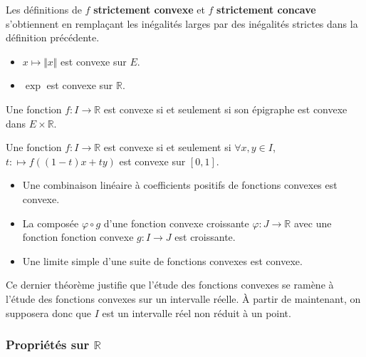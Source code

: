 	\begin{remark}
		Les définitions de $f$ \textbf{strictement convexe} et $f$ \textbf{strictement concave} s'obtiennent en remplaçant les inégalités larges par des inégalités strictes dans la définition précédente.
	\end{remark}

	\begin{example}
		\begin{itemize}
			\item $x \mapsto \Vert x \Vert$ est convexe sur $E$.
			\item $\exp$ est convexe sur $\mathbb{R}$.
		\end{itemize}
	\end{example}

	\begin{proposition}
		Une fonction $f : I \rightarrow \mathbb{R}$ est convexe si et seulement si son épigraphe est convexe dans $E \times \mathbb{R}$.
	\end{proposition}

	\begin{theorem}
		Une fonction $f : I \rightarrow \mathbb{R}$ est convexe si et seulement si $\forall x, y \in I$, $t : \mapsto f((1-t)x + ty)$ est convexe sur $[0,1]$.
	\end{theorem}

	\begin{proposition}
		\begin{itemize}
			\item Une combinaison linéaire à coefficients positifs de fonctions convexes est convexe.
			\item La composée $\varphi \circ g$ d'une fonction convexe croissante $\varphi : J \rightarrow \mathbb{R}$ avec une fonction fonction convexe $g : I \rightarrow J$ est croissante.
			\item Une limite simple d'une suite de fonctions convexes est convexe.
		\end{itemize}
	\end{proposition}

	Ce dernier théorème justifie que l'étude des fonctions convexes se ramène à l'étude des fonctions convexes sur un intervalle réelle. À partir de maintenant, on supposera donc que $I$ est un intervalle réel non réduit à un point.

	\subsubsection{Propriétés sur \texorpdfstring{$\mathbb{R}$}{R}}

